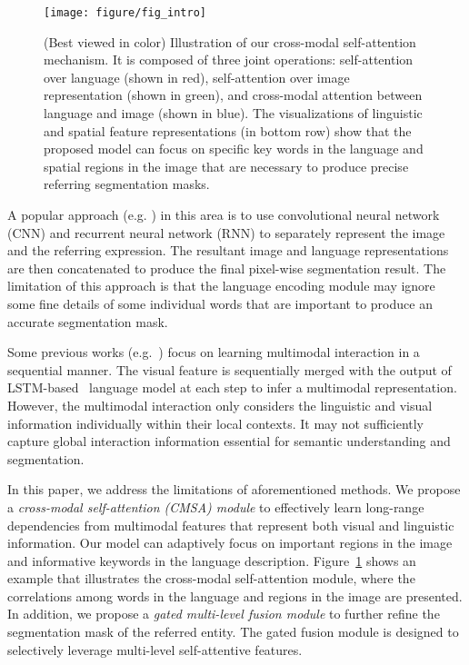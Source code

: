 \documentclass[10pt,twocolumn,letterpaper]{article}
\begin{document}
\begin{figure}[htb]
  \centering
  \texttt{[image: figure/fig\_intro]}
\caption{(Best viewed in color) Illustration of our cross-modal self-attention mechanism. It is composed of three joint operations: self-attention over language (shown in red), self-attention over image representation (shown in green), and cross-modal attention between language and image (shown in blue). The visualizations of linguistic and spatial feature representations (in bottom row) show that the proposed model can focus on specific key words in the language and spatial regions in the image that are necessary to produce precise referring segmentation masks.} 
	
\label{fig:intro} 
\end{figure}


A popular approach (e.g. \cite{hu2016segmentation,li2018referring,shi2018key}) in this area is to use convolutional neural network (CNN) and recurrent neural network (RNN) to separately represent the image and the referring expression. The resultant image and language representations are then concatenated to produce the final pixel-wise segmentation result. The limitation of this approach is that the language encoding module may ignore some fine details of some individual words that are important to produce an accurate segmentation mask. 

Some previous works (e.g.~\cite{liu2017recurrent,margffoy2018dynamic}) focus on learning multimodal interaction in a sequential manner. The visual feature is sequentially merged with the output of LSTM-based~\cite{hochreiter1997long} language model at each step to infer a multimodal representation. However, the multimodal interaction only considers the linguistic and visual information individually within their local contexts. It may not sufficiently capture global interaction information essential for semantic understanding and segmentation. 

In this paper, we address the limitations of aforementioned methods. We propose a \textit{cross-modal self-attention (CMSA) module} to effectively learn long-range dependencies from multimodal features that represent both visual and linguistic information. Our model can adaptively focus on important regions in the image and informative keywords in the language description. Figure~\ref{fig:intro} shows an example that illustrates the cross-modal self-attention module, where the correlations among words in the language and regions in the image are presented. In addition, we propose a \textit{gated multi-level fusion module} to further refine the segmentation mask of the referred entity. The gated fusion module is designed to selectively leverage multi-level self-attentive features. 
\end{document}
